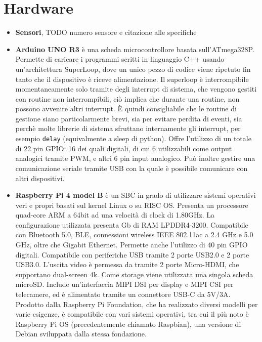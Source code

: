 \documentclass[12pt,a4paper,openright,twoside]{book}
\begin{document}
\section{Hardware}

\begin{itemize}[noitemsep]
    \item \textbf{Sensori}, TODO numero sensore e citazione alle specifiche
    \item \textbf{Arduino UNO R3} è una scheda microcontrollore basata sull'ATmega328P. Permette di caricare i programmi scritti in linguaggio C++ usando un'architettura SuperLoop, dove un unico pezzo di codice viene ripetuto fin tanto che il dispositivo è riceve alimentazione. Il superloop è interrompibile momentaneamente solo tramite degli interrupt di sistema, che vengono gestiti con routine non interrompibili, ciò implica che durante una routine, non possono avvenire altri interrupt. È quindi consigliabile che le routine di gestione siano particolarmente brevi, sia per evitare perdita di eventi, sia perchè molte librerie di sistema sfruttano internamente gli interrupt, per esempio \texttt{delay} (equivalmente a sleep di python). Offre l'utilizzo di un totale di 22 pin \ac{GPIO}: 16 dei quali digitali, di cui 6 utilizzabili come output analogici tramite \ac{PWM}, e altri 6 pin input analogico. Può inoltre gestire una comunicazione seriale tramite USB con la quale è possibile comunicare con altri dispositivi.
    \item \textbf{Raspberry Pi 4 model B} è un \ac{SBC} in grado di utilizzare sistemi operativi veri e propri basati sul kernel Linux o su RISC OS. Presenta un processore quad-core ARM a 64bit ad una velocità di clock di 1.80GHz. La configurazione utilizzata presenta  Gb di RAM LPDDR4-3200. Compatibile con Bluetooth 5.0, BLE, connessioni wireless IEEE 802.11ac a 2.4 GHz e 5.0 GHz, oltre che Gigabit Ethernet. Permette anche l'utilizzo di 40 pin GPIO digitali. Compatibile con periferiche USB tramite 2 porte USB2.0 e 2 porte USB3.0. L'uscita video è permessa da tramite 2 porte Micro-HDMI, che supportano dual-screen 4k. Come storage viene utilizzata una singola scheda microSD. Include un'interfaccia MIPI DSI per display e MIPI CSI per telecamere, ed è alimentato tramite un connettore USB-C da 5V/3A. Prodotto dalla Raspberry Pi Foundation, che ha realizzato diversi modelli per varie esigenze, è compatibile con vari sistemi operativi, tra cui il più noto è Raspberry Pi OS (precedentemente chiamato Raspbian), una versione di Debian sviluppata dalla stessa fondazione.
\end{itemize}
\end{document}
